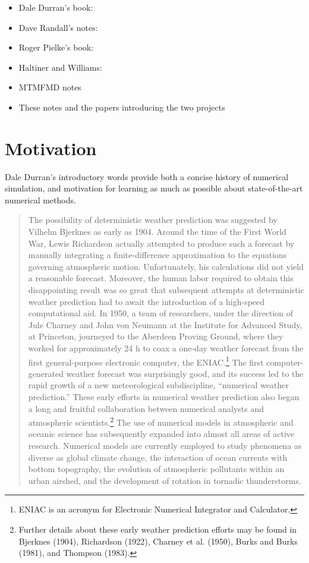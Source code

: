 \documentclass[11pt,fleqn]{book} %
\begin{document}
	\begin{itemize}
		\item	Dale Durran's book:  \cite {Durran-book}
		\item	Dave Randall's notes:  \cite{Randall-notes}
		\item   Roger Pielke's book:  \cite {Pielke-book}
		\item   Haltiner and Williams:  \cite {Haltiner-Williams-book}
		\item	MTMFMD notes
		\item	These notes and the papers introducing the two projects		
	\end{itemize}
	
	\section{Motivation}
	
	Dale Durran's introductory words provide both a concise history of numerical simulation, and motivation for learning as much as possible about state-of-the-art numerical methods.
	
	\begin{quotation}
	The possibility of deterministic weather prediction was suggested by Vilhelm Bjerknes as early as 1904. Around the time of the First World War, Lewis Richardson actually attempted to produce such a forecast by manually integrating a finite-difference approximation to the equations governing atmospheric motion. Unfortunately, his calculations did not yield a reasonable forecast. Moreover, the human labor required to obtain this disappointing result was so great that subsequent attempts at deterministic weather prediction had to await the introduction of a high-speed computational aid. In 1950, a team of researchers, under the direction of Jule Charney and John von Neumann at the Institute for Advanced Study, at Princeton, journeyed to the Aberdeen Proving Ground, where they worked for approximately 24 h to coax a one-day weather forecast from the first general-purpose electronic computer, the ENIAC.\footnote{ENIAC is an acronym for Electronic Numerical Integrator and Calculator.} The first computer-generated weather forecast was surprisingly good, and its success led to the rapid growth of a new meteorological subdiscipline, “numerical weather prediction.” These early efforts in numerical weather prediction also began a long and fruitful collaboration between numerical analysts and atmospheric scientists.\footnote{Further details about these early weather prediction efforts may be found in Bjerknes (1904), Richardson (1922), Charney et al. (1950), Burks and Burks (1981), and Thompson (1983).} The use of numerical models in atmospheric and oceanic science has subsequently expanded into almost all areas of active research. Numerical models are currently employed to study phenomena as diverse as global climate change, the interaction of ocean currents with bottom topography, the evolution of atmospheric pollutants within an urban airshed, and the development of rotation in tornadic thunderstorms.
	\end{quotation}
\end{document}

